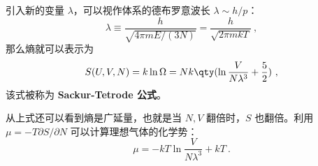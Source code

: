 引入新的变量 $\lambda$，可以视作体系的德布罗意波长 $\lambda\sim h/p$：
\begin{equation}
\lambda \equiv \frac{h}{\sqrt{4\pi mE/(3N)}} = \frac{h}{\sqrt{2\pi mkT}}~,
\end{equation}
那么熵就可以表示为
\begin{equation}\label{eq_IdeaS_2}
S(U, V, N) = k\ln \Omega  = Nk \qty(\ln \frac{V}{N\lambda^3} + \frac52)~,
\end{equation}
该式被称为 \textbf{Sackur-Tetrode 公式}。 

从上式还可以看到熵是广延量，也就是当 $N,V$ 翻倍时，$S$ 也翻倍。利用 $\mu=-T\partial S/\partial N$ 可以计算理想气体的化学势：
\begin{equation}
\mu=-kT\ln \frac{V}{N\lambda^3}+kT~.
\end{equation}
